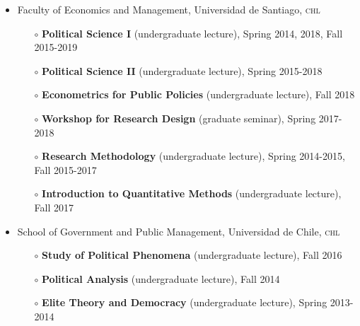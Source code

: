 \documentclass[letterpaper,margin]{res}
\begin{document}
\begin{resume}
\begin{itemize}
\item{\small Faculty of Economics and Management, Universidad de Santiago, {\scshape chl}}
\begin{itemize}
\item[$\circ$]{\small {\bf Political Science I} (undergraduate lecture), Spring 2014, 2018, Fall 2015-2019}
\item[$\circ$]{\small {\bf Political Science II} (undergraduate lecture), Spring 2015-2018}
\item[$\circ$]{\small {\bf Econometrics for Public Policies} (undergraduate lecture), Fall 2018}
\item[$\circ$]{\small {\bf Workshop for Research Design} (graduate seminar), Spring 2017-2018}
\item[$\circ$]{\small {\bf Research Methodology} (undergraduate lecture), Spring 2014-2015, Fall 2015-2017}
\item[$\circ$]{\small {\bf Introduction to Quantitative Methods} (undergraduate lecture), Fall 2017}
\end{itemize}
\item{\small School of Government and Public Management, Universidad de Chile, {\scshape chl}}
\begin{itemize}
\item[$\circ$]{\small {\bf Study of Political Phenomena} (undergraduate lecture), Fall 2016}
\item[$\circ$]{\small {\bf Political Analysis} (undergraduate lecture), Fall 2014}
\item[$\circ$]{\small {\bf Elite Theory and Democracy} (undergraduate lecture), Spring 2013-2014}
\end{itemize}
\end{itemize}




\end{resume}
\end{document}

